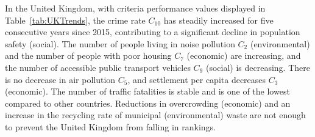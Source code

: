 \documentclass[final,5p,times,twocolumn,authoryear]{elsarticle}
\begin{document}
%
\begin{table}[H]
\centering
\caption{Trends in sustainability indicators published by Eurostat for Finland.}
\label{tab:FinlandTrends}
\end{table}
%
In the United Kingdom, with criteria performance values displayed in Table~\ref{tab:UKTrends}, the crime rate $C_{10}$ has steadily increased for five consecutive years since 2015, contributing to a significant decline in population safety (social). The number of people living in noise pollution $C_{2}$ (environmental) and the number of people with poor housing $C_{7}$ (economic) are increasing, and the number of accessible public transport vehicles $C_{9}$ (social) is decreasing. There is no decrease in air pollution $C_{5}$, and settlement per capita decreases $C_{3}$ (economic). The number of traffic fatalities is stable and is one of the lowest compared to other countries. Reductions in overcrowding (economic) and an increase in the recycling rate of municipal (environmental) waste are not enough to prevent the United Kingdom from falling in rankings.
%
\end{document}

